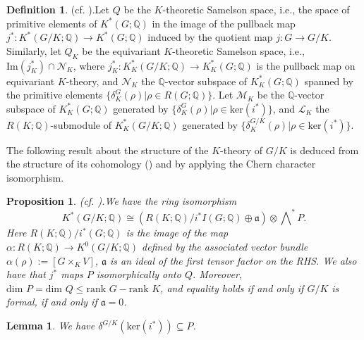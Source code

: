 \documentclass[11pt]{amsart}
\theoremstyle{plain}
\newtheorem{lemma}[theorem]{Lemma}
\newtheorem{proposition}[theorem]{Proposition}
\theoremstyle{definition}
\newtheorem{definition}[theorem]{Definition}
\begin{document}
\begin{definition}(cf. \cite[Definition 6.1]{CFok}).\label{equivsamelson}
	Let $Q$ be the $K$-theoretic Samelson space, i.e., the space of primitive elements of $K^*(G; \mathbb{Q})$ in the image of the pullback map $j^*: K^*(G/K; \mathbb{Q})\to K^*(G; \mathbb{Q})$ induced by the quotient map $j: G\to G/K$. Similarly, let $Q_K$ be the equivariant $K$-theoretic Samelson space, i.e., $\text{Im}(j_K^*)\cap \mathcal{N}_K$, where $j_K^*: K_K^*(G/K; \mathbb{Q})\to K_K^*(G; \mathbb{Q})$ is the pullback map on equivariant $K$-theory, and $\mathcal{N}_K$ the $\mathbb{Q}$-vector subspace of $K_K^*(G; \mathbb{Q})$ spanned by the primitive elements $\{\delta_K^G(\rho)|\rho\in R(G; \mathbb{Q})\}$. Let $\mathcal{M}_K$ be the $\mathbb{Q}$-vector subspace of $K_K^*(G; \mathbb{Q})$ generated by $\{\delta_K^G(\rho)|\rho\in\text{ker}(i^*)\}$, and $\mathcal{L}_K$ the $R(K; \mathbb{Q})$-submodule of $K_K^*(G/K; \mathbb{Q})$ generated by $\{\delta_K^{G/K}(\rho)|\rho\in\text{ker}(i^*)\}$.%
\end{definition}
The following result about the structure of the $K$-theory of $G/K$ is deduced from the structure of its cohomology (\cite[pp. 73, 83, 152]{GHV}) and by applying the Chern character isomorphism.
\begin{proposition}\textnormal{(cf. \cite[Theorem 6.2]{CFok}).}\label{kthrystructure}
	We have the ring isomorphism
	\[K^*(G/K; \mathbb{Q})\cong (R(K; \mathbb{Q})/i^*I(G; \mathbb{Q})\oplus\mathfrak{a})\otimes\bigwedge\nolimits^*P.\]
	Here $R(K; \mathbb{Q})/i^*(G; \mathbb{Q})$ is the image of the map $\alpha: R(K; \mathbb{Q})\to K^0(G/K; \mathbb{Q})$ defined by the associated vector bundle $\alpha(\rho):=[G\times_K V]$, $\mathfrak{a}$ is an ideal of the first tensor factor on the RHS. We also have that $j^*$ maps $P$ isomorphically onto $Q$. Moreover, $\text{dim }P=\text{dim }Q\leq \text{rank }G-\text{rank }K$, and equality holds if and only if $G/K$ is formal, if and only if $\mathfrak{a}=0$.
\end{proposition}
\begin{lemma}\label{key}
	We have $\delta^{G/K}(\text{ker}(i^*))\subseteq P$.%
\end{lemma}
\end{document}
